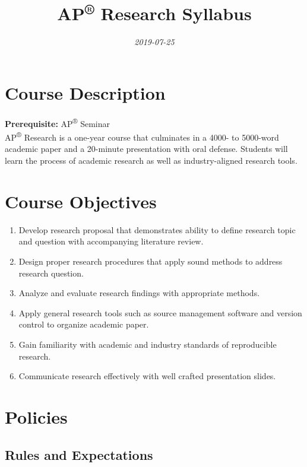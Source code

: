 \documentclass[11pt,]{article}
\title{AP\textsuperscript{®} Research Syllabus}
\author{}
\date{\emph{2019-07-25}}
\providecommand{\tightlist}{%
  \setlength{\itemsep}{0pt}\setlength{\parskip}{0pt}}
\begin{document}
\maketitle

{
\setcounter{tocdepth}{2}
\tableofcontents
}
\newpage
\hypersetup{linkcolor=blue}

\hypertarget{course-description}{%
\section{Course Description}\label{course-description}}

\textbf{Prerequisite:} AP\textsuperscript{®} Seminar\\
AP\textsuperscript{®} Research is a one-year course that culminates in a 4000- to 5000-word academic paper and a 20-minute presentation with oral defense. Students will learn the process of academic research as well as industry-aligned research tools.

\hypertarget{course-objectives}{%
\section{Course Objectives}\label{course-objectives}}

\begin{enumerate}
\def\labelenumi{\arabic{enumi}.}
\tightlist
\item
  Develop research proposal that demonstrates ability to define research topic and question with accompanying literature review.
\item
  Design proper research procedures that apply sound methods to address research question.
\item
  Analyze and evaluate research findings with appropriate methods.
\item
  Apply general research tools such as source management software and version control to organize academic paper.
\item
  Gain familiarity with academic and industry standards of reproducible research.
\item
  Communicate research effectively with well crafted presentation slides.
\end{enumerate}

\hypertarget{policies}{%
\section{Policies}\label{policies}}

\hypertarget{rules-and-expectations}{%
\subsection{Rules and Expectations}\label{rules-and-expectations}}
\end{document}
